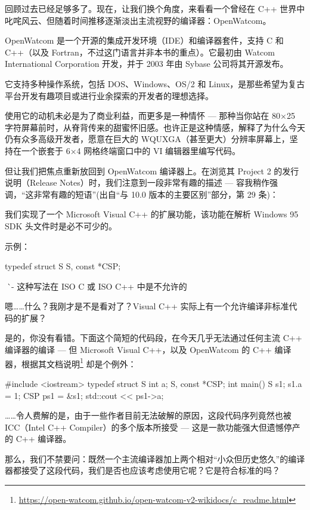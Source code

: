回顾过去已经足够多了。现在，让我们换个角度，来看看一个曾经在 C++ 世界中叱咤风云、但随着时间推移逐渐淡出主流视野的编译器：OpenWatcom。

OpenWatcom 是一个开源的集成开发环境（IDE）和编译器套件，支持 C 和 C++（以及 Fortran，不过这门语言并非本书的重点）。它最初由 Watcom International Corporation 开发，并于 2003 年由 Sybase 公司将其开源发布。

它支持多种操作系统，包括 DOS、Windows、OS/2 和 Linux，是那些希望为复古平台开发有趣项目或进行业余探索的开发者的理想选择。

使用它的动机未必是为了商业利益，而更多是一种情怀 --- 那种当你站在 80×25 字符屏幕前时，从脊背传来的甜蜜怀旧感。也许正是这种情感，解释了为什么今天仍有众多高级开发者，愿意在巨大的 WQUXGA（甚至更大）分辨率屏幕上，坚持在一个嵌套于 6×4 网格终端窗口中的 VI 编辑器里编写代码。

但让我们把焦点重新放回到 OpenWatcom 编译器上。在浏览其 Project 2 的发行说明（Release Notes）时，我们注意到一段非常有趣的描述 --- 容我稍作强调，“这非常有趣的短语”(出自“与 10.0 版本的主要区别”部分，第 29 条)：

\begin{shell}
我们实现了一个 Microsoft Visual C++ 的扩展功能，该功能在解析 Windows 95 SDK 头文件时是必不可少的。

示例：

typedef struct S {
} S, const *CSP;

^^^^^ - 这种写法在 ISO C 或 ISO C++ 中是不允许的
\end{shell}

嗯……什么？我刚才是不是看对了？Visual C++ 实际上有一个允许编译非标准代码的扩展？

是的，你没有看错。下面这个简短的代码段，在今天几乎无法通过任何主流 C++ 编译器的编译 --- 但 Microsoft Visual C++，以及 OpenWatcom 的 C++ 编译器，根据其文档说明\footnote{\url{https://open-watcom.github.io/open-watcom-v2-wikidocs/c_readme.html}} 却是个例外：

\begin{cpp}
#include <iostream>
typedef struct S {
  int a;
} S, const *CSP;
int main() {
  S s1; s1.a = 1;
  CSP ps1 = &s1;
  std::cout << ps1->a;
}
\end{cpp}

……令人费解的是，由于一些作者目前无法破解的原因，这段代码序列竟然也被 ICC（Intel C++ Compiler）的多个版本所接受 --- 这是一款功能强大但遗憾停产的 C++ 编译器。

那么，我们不禁要问：既然一个主流编译器加上两个相对“小众但历史悠久”的编译器都接受了这段代码，我们是否也应该考虑使用它呢？它是符合标准的吗？


